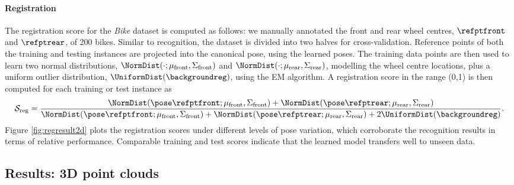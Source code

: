 \paragraph{Registration} 
The registration score for the \emph{Bike} dataset is computed as follows: we manually annotated the front and rear wheel centres, $\refptfront$ and $\refptrear$, of 200 bikes. Similar to recognition, the dataset is divided into two halves for cross-validation. Reference points of both the training and testing instances are projected into the canonical pose, using the learned poses. The training data points are then used to learn two normal distributions, $\NormDist(\cdot;\mu_\mathrm{front},\Sigma_\mathrm{front})$ and $\NormDist(\cdot;\mu_\mathrm{rear},\Sigma_\mathrm{rear})$, modelling the wheel centre locations, plus a uniform outlier distribution, $\UniformDist(\backgroundreg)$, using the EM algorithm. A registration score in the range (0,1) is then computed for each training or test instance as
\begin{equation}
\mathcal{S}_\mathrm{reg} = \frac{\NormDist(\pose\refptfront; \mu_\mathrm{front},\Sigma_\mathrm{front}) + \NormDist(\pose\refptrear; \mu_\mathrm{rear},\Sigma_\mathrm{rear})}{\NormDist(\pose\refptfront; \mu_\mathrm{front},\Sigma_\mathrm{front}) + \NormDist(\pose\refptrear; \mu_\mathrm{rear},\Sigma_\mathrm{rear}) + 2\UniformDist(\backgroundreg)}.
\label{eq:reg2d_score}
\end{equation}
Figure \ref{fig:regresult2d} plots the registration scores under different levels of pose variation, which corroborate the recognition results in terms of relative performance. Comparable training and test scores indicate that the learned model transfers well to unseen data.

\vspace{-0mm}
\subsection{Results: 3D point clouds}

